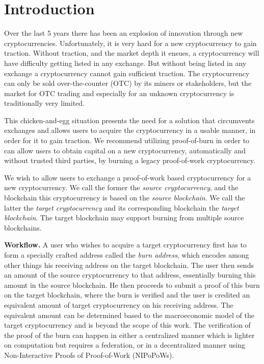 \section{Introduction}\label{section:introduction}

Over the last 5 years there has been an explosion of innovation through new cryptocurrencies. Unfortunately, it is very hard for a new cryptocurrency to gain traction. Without traction, and the market depth it ensues, a cryptocurrency will have difficulty getting listed in any exchange. But without being listed in any exchange a cryptocurrency cannot gain sufficient traction. The cryptocurrency can only be sold over-the-counter (OTC) by its miners or stakeholders, but the market for OTC trading and especially for an unknown cryptocurrency is traditionally very limited.

This chicken-and-egg situation presents the need for a solution that circumvents exchanges and allows users to acquire the cryptocurrency in a usable manner, in order for it to gain traction. We recommend utilizing proof-of-burn in order to can allow users to obtain capital on a new cryptocurrency, automatically and without trusted third parties, by burning a legacy proof-of-work cryptocurrency.

We wish to allow users to exchange a proof-of-work based cryptocurrency for a new cryptocurrency. We call the former the \emph{source cryptocurrency}, and the blockchain this cryptocurrency is based on the \emph{source blockchain}. We call the latter the \emph{target cryptocurrency} and its corresponding blockchain the \emph{target blockchain}. The target blockchain may support burning from multiple source blockchains.

\noindent
\textbf{Workflow.}
A user who wishes to acquire a target cryptocurrency first has to form a specially crafted address called the \emph{burn address}, which encodes among other things his receiving address on the target blockchain. The user then sends an amount of the source cryptocurrency to that address, essentially burning this amount in the source blockchain. He then proceeds to submit a proof of this burn on the target blockchain, where the burn is verified and the user is credited an equivalent amount of target cryptocurrency on his receiving address. The equivalent amount can be determined based to the macroeconomic model of the target cryptocurrency and is beyond the scope of this work. The verification of the proof of the burn can happen in either a centralized manner which is lighter on computation but requires a federation, or in a decentralized manner using Non-Interactive Proofs of Proof-of-Work (NIPoPoWs).

